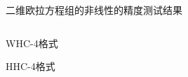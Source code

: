 \documentclass[aspectratio=169]{beamer}
\begin{document}
\begin{frame}{二维欧拉方程组的非线性的精度测试结果}
  
  \vspace{-3mm}
  \begin{columns}
    \begin{column}{0.2\textwidth}
      
      \centering
      
      WHC-4格式
      
      \vspace{0.4\textheight}
      
      HHC-4格式
      
    \end{column}
    \begin{column}{0.8\textwidth}
      \begin{small}
        
      \end{small}
    \end{column}
  \end{columns}
  
\end{frame}




\end{document}
